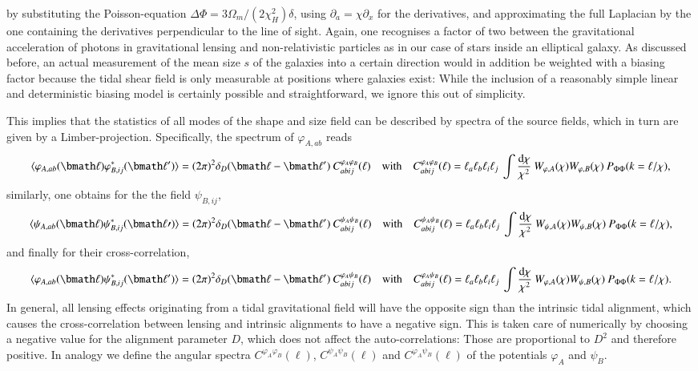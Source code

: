 \documentclass[a4paper,fleqn,usenatbib]{mnras}
\newcommand{\bra}{\langle}
\newcommand{\ket}{\rangle}
\newcommand{\dd}{\mathrm{d}}
\newcommand{\dirac}{\delta_D}
\begin{document}
by substituting the Poisson-equation $\Delta\Phi = 3\Omega_m/(2\chi_H^2)\delta$, using $\partial_a = \chi\partial_x$ for the derivatives, and approximating the full Laplacian by the one containing the derivatives perpendicular to the line of sight. Again, one recognises a factor of two between the gravitational acceleration of photons in gravitational lensing and non-relativistic particles as in our case of stars inside an elliptical galaxy. As discussed before, an actual measurement of the mean size $s$ of the galaxies into a certain direction would in addition be weighted with a biasing factor because the tidal shear field is only measurable at positions where galaxies exist: While the inclusion of a reasonably simple linear and deterministic biasing model is certainly possible and straightforward, we ignore this out of simplicity. 

This implies that the statistics of all modes of the shape and size field can be described by spectra of the source fields, which in turn are given by a Limber-projection. Specifically, the spectrum of $\varphi_{A,ab}$ reads
\begin{equation}
\bra\varphi_{A,ab}(\bmath\ell)\varphi_{B,ij}^*(\bmath\ell^\prime)\ket = 
(2\pi)^2\dirac(\bmath\ell-\bmath\ell^\prime)\:C^{\varphi_A\varphi_B}_{abij}(\ell)
\quad\mathrm{with}\quad
C^{\varphi_A\varphi_B}_{abij}(\ell) = 
\ell_a\ell_b\ell_i\ell_j\:\int\frac{\dd\chi}{\chi^2}\:W_{\varphi,A}(\chi)W_{\varphi,B}(\chi)\:P_{\Phi\Phi}(k = \ell/\chi),
\end{equation}
similarly, one obtains for the the field $\psi_{B,ij}$,
\begin{equation}
\bra\psi_{A,ab}(\bmath\ell)\psi_{B,ij}^*(\bmath\ell\prime)\ket = 
(2\pi)^2\dirac(\bmath\ell-\bmath\ell^\prime)\:C^{\psi_A\psi_B}_{abij}(\ell)
\quad\mathrm{with}\quad
C^{\psi_A\psi_B}_{abij}(\ell) = 
\ell_a\ell_b\ell_i\ell_j\:\int\frac{\dd\chi}{\chi^2}\:W_{\psi,A}(\chi)W_{\psi,B}(\chi)\:P_{\Phi\Phi}(k = \ell/\chi),
\end{equation}
and finally for their cross-correlation,
\begin{equation}
\bra\varphi_{A,ab}(\bmath\ell)\psi_{B,ij}^*(\bmath\ell^\prime)\ket =
(2\pi)^2\dirac(\bmath\ell-\bmath\ell^\prime)\:C^{\varphi_A\psi_B}_{abij}(\ell)
\quad\mathrm{with}\quad
C^{\varphi_A\psi_B}_{abij}(\ell) =
\ell_a\ell_b\ell_i\ell_j\:\int\frac{\dd\chi}{\chi^2}\:W_{\varphi,A}(\chi)W_{\psi,B}(\chi)\:P_{\Phi\Phi}(k = \ell/\chi).
\end{equation}
In general, all lensing effects originating from a tidal gravitational field will have the opposite sign than the intrinsic tidal alignment, which causes the cross-correlation between lensing and intrinsic alignments to have a negative sign. This is taken care of numerically by choosing a negative value for the alignment parameter $D$, which does not affect the auto-correlations: Those are proportional to $D^2$ and therefore positive. In analogy we define the angular spectra $C^{\varphi_A\varphi_B}(\ell)$, $C^{\psi_A\psi_B}(\ell)$ and $C^{\varphi_A\psi_B}(\ell)$ of the potentials $\varphi_A$ and  $\psi_B$.
\end{document}
